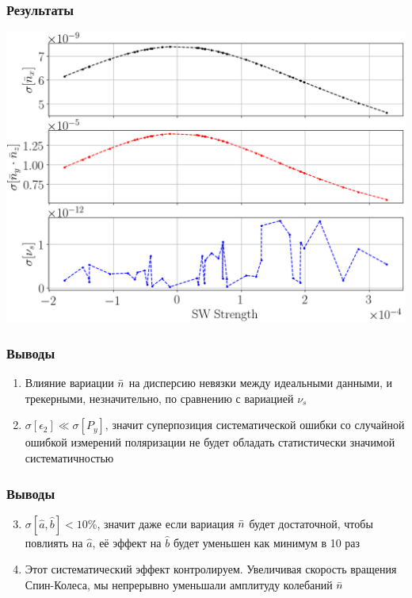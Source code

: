 \documentclass[14pt]{beamer}
\begin{document}
\begin{frame}\frametitle{Результаты}
	\includegraphics[width=\linewidth]{smp_sim/NBAR_variation_sd_vs_SW}
\end{frame}
\begin{frame}\frametitle{Выводы}
	\begin{enumerate}
		\item Влияние вариации $\bar n$ на дисперсию невязки между идеальными данными, и трекерными, незначительно, по сравнению с вариацией $\nu_s$
		\item $\sigma[\epsilon_2] \ll \sigma[P_y]$, значит суперпозиция систематической ошибки со случайной ошибкой измерений поляризации не будет обладать статистически значимой систематичностью
	\end{enumerate}
\end{frame}
\begin{frame}\frametitle{Выводы}
	\begin{enumerate} \setcounter{enumi}{2}
		\item $\sigma[\hat a, \hat b] < 10\%$, значит даже если вариация $\bar n$ будет достаточной, чтобы повлиять на $\hat a$, её эффект на $\hat b$ будет уменьшен как минимум в 10 раз
		\item Этот систематический эффект контролируем. Увеличивая скорость вращения Спин-Колеса, мы непрерывно уменьшали амплитуду колебаний $\bar n$
	\end{enumerate}
\end{frame}
\end{document}
